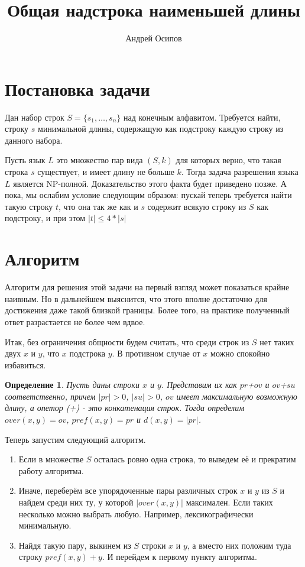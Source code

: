 \documentclass[a4paper,12pt]{article}
\title{Общая надстрока наименьшей длины}
\author{Андрей Осипов}
\newtheorem{definition}{Определение}
\begin{document}
\Russian
\maketitle

\section{Постановка задачи}
Дан набор строк $S = \{s_1,\dots,s_n\}$ над конечным алфавитом. 
Требуется найти, строку $s$ минимальной длины, содержащую как подстроку каждую строку из данного набора.

Пусть язык $L$ это множество пар вида $(S, k)$ для которых верно, что такая строка $s$ существует, и имеет длину не больше $k$.
Тогда задача разрешения языка $L$ является NP-полной.
Доказательство этого факта будет приведено позже.
А пока, мы ослабим условие следующим образом: пускай теперь требуется найти такую строку $t$, 
что она так же как и $s$ содержит всякую строку из $S$ как подстроку, и при этом $|t| \leq 4*|s|$

\section{Алгоритм}
Алгоритм для решения этой задачи на первый взгляд может показаться крайне наивным.
Но в дальнейшем выяснится, что этого вполне достаточно для достижения даже такой близкой границы.
Более того, на практике полученный ответ разрастается не более чем вдвое.

Итак, без ограничения общности будем считать, что среди строк из $S$ нет таких двух $x$ и $y$, что $x$ подстрока $y$.
В противном случае от $x$ можно спокойно избавиться.

\begin{definition}
Пусть даны строки $x$ и $y$.
Представим их как $pr$+$ov$ и $ov$+$su$ соответственно, причем $|pr|>0$, $|su|>0$, $ov$ имеет максимальную возможную длину, а опетор (+) - это конкатенация строк.
Тогда определим $over(x, y) = ov$, $pref(x, y) = pr$ и $d(x, y) = |pr|$.
\end{definition}

\noindent Теперь запустим следующий алгоритм.
\begin{enumerate}
\item Если в множестве $S$ осталась ровно одна строка, то выведем её и прекратим работу алгоритма.
\item Иначе, переберём все упорядоченные пары различных строк $x$ и $y$ из $S$ и найдем среди них ту, у которой $|over(x, y)|$ максимален.
Если таких несколько можно выбрать любую. Например, лексикографически минимальную.
\item Найдя такую пару, выкинем из $S$ строки $x$ и $y$, а вместо них положим туда строку $pref(x, y)+y$. 
И перейдем к первому пункту алгоритма.
\end{enumerate}
\end{document}
